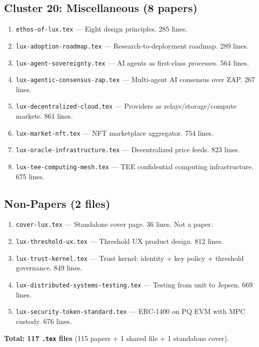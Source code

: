\documentclass[11pt,a4paper]{article}
\begin{document}
\subsection{Cluster 20: Miscellaneous (8 papers)}
\begin{enumerate}[leftmargin=2em]
\item \texttt{ethos-of-lux.tex} --- Eight design principles. 285 lines.
\item \texttt{lux-adoption-roadmap.tex} --- Research-to-deployment roadmap. 289 lines.
\item \texttt{lux-agent-sovereignty.tex} --- AI agents as first-class processes. 564 lines.
\item \texttt{lux-agentic-consensus-zap.tex} --- Multi-agent AI consensus over ZAP. 267 lines.
\item \texttt{lux-decentralized-cloud.tex} --- Providers as relays/storage/compute markets. 861 lines.
\item \texttt{lux-market-nft.tex} --- NFT marketplace aggregator. 754 lines.
\item \texttt{lux-oracle-infrastructure.tex} --- Decentralized price feeds. 823 lines.
\item \texttt{lux-tee-computing-mesh.tex} --- TEE confidential computing infrastructure. 675 lines.
\end{enumerate}

\subsection{Non-Papers (2 files)}
\begin{enumerate}[leftmargin=2em]
\item \texttt{cover-lux.tex} --- Standalone cover page. 36 lines. Not a paper.
\item \texttt{lux-threshold-ux.tex} --- Threshold UX product design. 812 lines.
\item \texttt{lux-trust-kernel.tex} --- Trust kernel: identity + key policy + threshold governance. 849 lines.
\item \texttt{lux-distributed-systems-testing.tex} --- Testing from unit to Jepsen. 669 lines.
\item \texttt{lux-security-token-standard.tex} --- ERC-1400 on PQ EVM with MPC custody. 676 lines.
\end{enumerate}

\textbf{Total: 117 \texttt{.tex} files} (115 papers + 1 shared file + 1 standalone cover).

\end{document}
